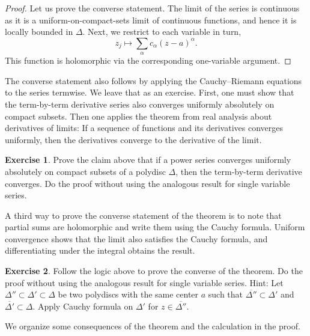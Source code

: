 \documentclass[12pt,openany]{book}
\theoremstyle{plain}
\theoremstyle{remark}
\theoremstyle{definition}
\newenvironment{exbox}{%
    \def\FrameCommand{\vrule width 1pt \relax\hspace{10pt}}%
    \MakeFramed{\advance\hsize-\width\FrameRestore}%
}{%
    \endMakeFramed
}
\theoremstyle{exercise}
\newtheorem{exercise}{Exercise}[section]
\theoremstyle{example}
\begin{document}
\begin{proof}
Let us prove the converse statement.
The limit of the series
is continuous as it is a uniform-on-compact-sets limit of continuous
functions, and hence it is locally bounded in $\Delta$.  Next,
we restrict to each variable in turn, 
\begin{equation*}
z_j \mapsto \sum_{\alpha} c_\alpha {(z-a)}^\alpha .
\end{equation*}
This function is holomorphic via the corresponding one-variable argument.
\end{proof}

The converse statement also follows by applying the Cauchy--Riemann
equations to the series termwise.
We leave that as an exercise.
First, one must show that the term-by-term derivative
series also converges uniformly absolutely on compact subsets.
Then one applies the theorem from real analysis about derivatives
of limits: If a sequence of functions and its derivatives converges
uniformly, then the derivatives converge to the derivative of the limit.

\begin{exbox}
\begin{exercise}
Prove the claim above that if a power series converges uniformly absolutely
on compact subsets of a polydisc $\Delta$, then the term-by-term derivative
converges.
Do the proof without using the analogous result for single variable series.
\end{exercise}
\end{exbox}

A third way to prove the converse statement of the theorem
is to note that partial sums are
holomorphic and write them using the Cauchy formula.  Uniform
convergence shows that the limit also satisfies the Cauchy formula, and
differentiating under the integral obtains the result.

\begin{exbox}
\begin{exercise}
Follow the logic above to prove the converse of the
theorem.
Do the proof without using the analogous result for single variable series.
Hint:
Let
$\Delta'' \subset \Delta' \subset \Delta$
be two polydiscs with the same center $a$
such that $\overline{\Delta''} \subset \Delta'$
and $\overline{\Delta'} \subset \Delta$.
Apply Cauchy formula on $\Delta'$
for $z \in \overline{\Delta''}$.
\end{exercise}
\end{exbox}

We organize some consequences of the theorem
and the calculation in the proof.
\end{document}
